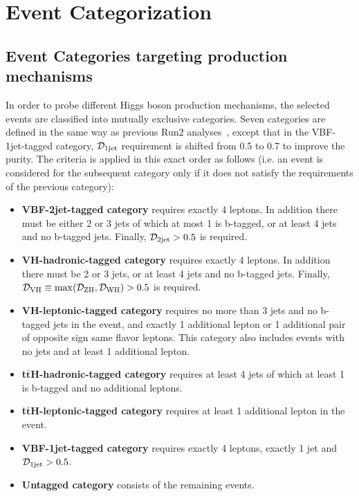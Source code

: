 
\section{Event Categorization}
\label{sec:categorization}
\subsection{Event Categories targeting production mechanisms}
In order to probe different Higgs boson production mechanisms, the selected events are classified into mutually exclusive categories. Seven categories are defined in the same way as previous Run2 analyses~\cite{CMS-PAS-HIG-18-001}, except that in the VBF-1jet-tagged category, ${\cal D}_{\rm 1jet}$ requirement is shifted from 0.5 to 0.7 to improve the purity. The criteria is applied in this exact order as follows (i.e. an event is considered for the subsequent category only if it does not satisfy the requirements of the previous category):
\begin{itemize}
\item {\bf VBF-2jet-tagged category} requires exactly 4 leptons. In addition there must be either 2 or 3 jets of which at most 1 is b-tagged, or at least 4 jets and no b-tagged jets. Finally, ${\cal D}_{\rm 2jet}>0.5$ is required.
\item {\bf VH-hadronic-tagged category} requires exactly 4 leptons. In addition there must be 2 or 3 jets, or at least 4 jets and no b-tagged jets. Finally, ${\cal D}_{\rm VH} \equiv {\rm max}({\cal D}_{\rm ZH},{\cal D}_{\rm WH})>0.5$ is required.
\item {\bf VH-leptonic-tagged category} requires no more than 3 jets and no b-tagged jets in the event,
and exactly 1 additional lepton or 1 additional pair of opposite sign same flavor leptons. This category also includes events
with no jets and at least 1 additional lepton.
\item {\bf t$\mathbf{\bar{t}}$H-hadronic-tagged category} requires at least 4 jets of which at least 1 is b-tagged and no additional leptons.
\item {\bf t$\mathbf{\bar{t}}$H-leptonic-tagged category} requires at least 1 additional lepton in the event.
\item {\bf VBF-1jet-tagged category} requires exactly 4 leptons, exactly 1 jet and ${\cal D}_{\rm 1jet}>0.5$.
\item {\bf Untagged category} consists of the remaining events.
\end{itemize}
